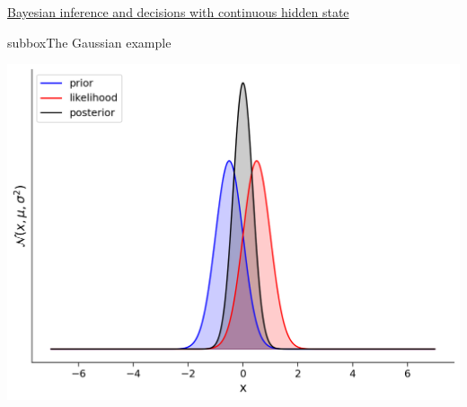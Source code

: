 \begin{textbox}{\href{https://compneuro.neuromatch.io/tutorials/W3D1_BayesianDecisions/student/W3D1_Tutorial2.html}{Bayesian inference and decisions with continuous hidden state } }
\begin{subbox}{subbox}{The Gaussian example}
\begin{center}
    
\includegraphics[scale=0.23]{Figures/BD/BD_Figure11.png}
\end{center}

\end{subbox}
\end{textbox}
